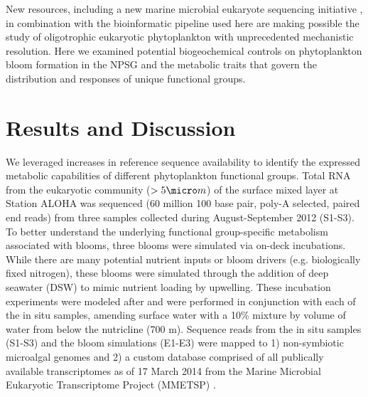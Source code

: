 New resources, including a new marine microbial eukaryote sequencing initiative \citep{Keeling2014}, in combination with the bioinformatic pipeline used here are making possible the study of oligotrophic eukaryotic phytoplankton with unprecedented mechanistic resolution. Here we examined potential biogeochemical controls on phytoplankton bloom formation in the NPSG and the metabolic traits that govern the distribution and responses of unique functional groups. \par
\section{Results and Discussion}
We leveraged increases in reference sequence availability \citep{Keeling2014} to identify the expressed metabolic capabilities of different phytoplankton functional groups. Total RNA from the eukaryotic community ($>5 \micro m$) of the surface mixed layer at Station ALOHA was sequenced (60 million 100 base pair, poly-A selected, paired end reads) from three samples collected during August-September 2012 (S1-S3). To better understand the underlying functional group-specific metabolism associated with blooms, three blooms were simulated via on-deck incubations. While there are many potential nutrient inputs or bloom drivers (e.g. biologically fixed nitrogen), these blooms were simulated through the addition of deep seawater (DSW) to mimic nutrient loading by upwelling.  These incubation experiments were modeled after \citet{McAndrew2007} and were performed in conjunction with each of the in situ samples, amending surface water with a 10\% mixture by volume of water from below the nutricline (700 m). Sequence reads from the in situ samples (S1-S3) and the bloom simulations (E1-E3) were mapped to 1) non-symbiotic microalgal genomes and 2) a custom database comprised of all publically available transcriptomes as of 17 March 2014 from the Marine Microbial Eukaryotic Transcriptome Project (MMETSP) \citep{Keeling2014}.\par 
